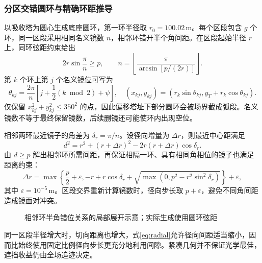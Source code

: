 \pagepart
\subsubsection{分区交错圆环与精确环距推导}
以吸收塔为圆心生成底座圆环，第一环半径取 $r_0=100.02\,\mathrm m$。每个区段包含 $g$ 个环，同一区段采用相同名义镜数 $n$，相邻环错开半个角间距。在区段起始半径 $r$ 上，同环弦距约束给出
\begin{equation}
2r\sin\frac{\pi}{n}\ge p,
\qquad n=\left\lfloor\frac{\pi}{\arcsin[p/(2r)]}\right\rfloor.
\end{equation}
第 $k$ 个环上第 $j$ 个名义镜位可写为
\begin{equation}
\theta_{kj}=\frac{2\pi}{n}\left[j+\frac12(k\bmod2)+\psi\right],\quad
(x_{kj},y_{kj})=(r_k\sin\theta_{kj},y_T+r_k\cos\theta_{kj}).
\end{equation}
仅保留 $x_{kj}^2+y_{kj}^2\le350^2$ 的点，因此偏移塔址下部分圆环会被场界截成弧段。名义镜数不等于最终保留镜数，后续删镜还可能使环内出现空位。

相邻两环最近镜子的角差为 $\delta_r=\pi/n$。设径向增量为 $\Delta r$，则最近中心距满足
\begin{equation}
d^2=r^2+(r+\Delta r)^2-2r(r+\Delta r)\cos\delta_r.
\end{equation}
由 $d\ge p$ 解出相邻环所需间距，再保证相隔一环、具有相同角相位的镜子也满足距离约束：
\begin{equation}\label{eq:radial}
\Delta r=\max\left\{\frac p2+\varepsilon,
-r+r\cos\delta_r+\sqrt{\max(0,p^2-r^2\sin^2\delta_r)}\right\}+\varepsilon,
\end{equation}
其中 $\varepsilon=10^{-5}\,\mathrm m$。区段交界重新计算镜数时，径向步长取 $p+\varepsilon$，避免不同角间距造成镜面对冲突。

\begin{figure}[H]\centering
{}
\caption{相邻环半角错位关系的局部展开示意；实际生成使用圆环弦距}
\end{figure}
同一区段半径增大时，切向距离也增大，式\eqref{eq:radial}允许径向间距适当缩小，因而比始终使用固定比例径向步长更充分地利用间隙。紧凑几何并不保证光学最佳，遮挡收益仍由全场追迹决定。

